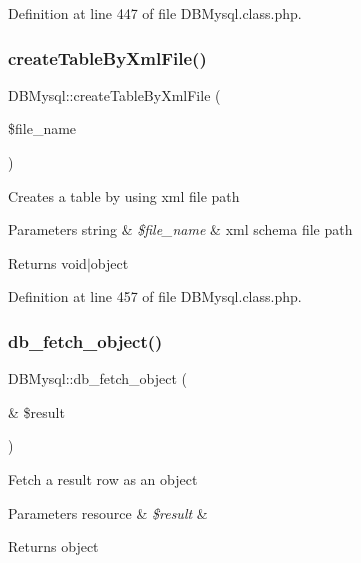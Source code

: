 Definition at line 447 of file D\+B\+Mysql.\+class.\+php.

\mbox{\label{classDBMysql_a92f43909e6ba226fc7067ddc25594a33}} 
\subsubsection{\texorpdfstring{create\+Table\+By\+Xml\+File()}{createTableByXmlFile()}}
{\footnotesize\ttfamily D\+B\+Mysql\+::create\+Table\+By\+Xml\+File (\begin{DoxyParamCaption}\item[{}]{\$file\+\_\+name }\end{DoxyParamCaption})}

Creates a table by using xml file path 
\begin{DoxyParams}[1]{Parameters}
string & {\em \$file\+\_\+name} & xml schema file path \\
\hline
\end{DoxyParams}
\begin{DoxyReturn}{Returns}
void$\vert$object 
\end{DoxyReturn}


Definition at line 457 of file D\+B\+Mysql.\+class.\+php.

\mbox{\label{classDBMysql_a117189e72a44d1c3b615f133f486cf69}} 
\subsubsection{\texorpdfstring{db\+\_\+fetch\+\_\+object()}{db\_fetch\_object()}}
{\footnotesize\ttfamily D\+B\+Mysql\+::db\+\_\+fetch\+\_\+object (\begin{DoxyParamCaption}\item[{\&}]{\$result }\end{DoxyParamCaption})}

Fetch a result row as an object 
\begin{DoxyParams}[1]{Parameters}
resource & {\em \$result} & \\
\hline
\end{DoxyParams}
\begin{DoxyReturn}{Returns}
object 
\end{DoxyReturn}


